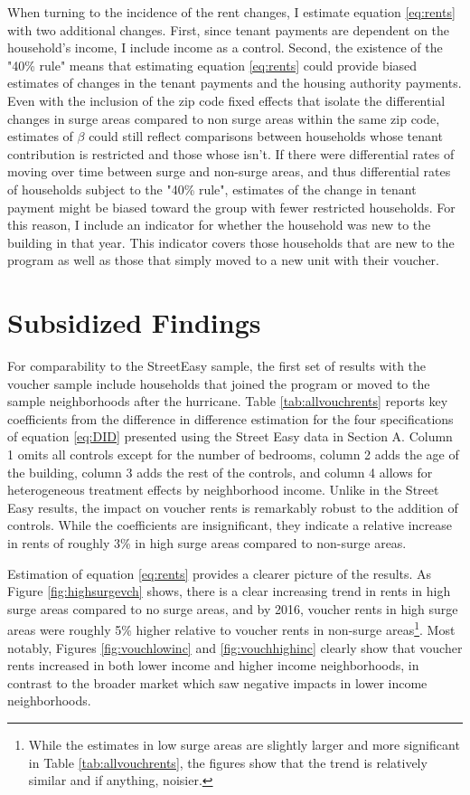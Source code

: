 \documentclass[12pt]{article}
\begin{document}
{{{{{When turning to the incidence of the rent changes, I estimate equation \ref{eq:rents} with two additional changes.  First, since tenant payments are dependent on the household's income, I include income as a control.  Second, the existence of the "40\% rule" means that estimating equation \ref{eq:rents} could provide biased estimates of changes in the tenant payments and the housing authority payments.  Even with the inclusion of the zip code fixed effects that isolate the differential changes in surge areas compared to non surge areas within the same zip code, estimates of $\beta$ could still reflect comparisons between households whose tenant contribution is restricted and those whose isn't.  If there were differential rates of moving over time between surge and non-surge areas, and thus differential rates of households subject to the "40\% rule", estimates of the change in tenant payment might be biased toward the group with fewer restricted households.  For this reason, I include an indicator for whether the household was new to the building in that year.  This indicator covers those households that are new to the program as well as those that simply moved to a new unit with their voucher.


\section{Subsidized Findings}

For comparability to the StreetEasy sample, the first set of results with the voucher sample include households that joined the program or moved to the sample neighborhoods after the hurricane. Table \ref{tab:allvouchrents} reports key coefficients from the difference in difference estimation for the four specifications of equation \ref{eq:DID} presented using the Street Easy data in Section A.  Column 1 omits all controls except for the number of bedrooms, column 2 adds the age of the building, column 3 adds the rest of the controls, and column 4 allows for heterogeneous treatment effects by neighborhood income.  Unlike in the Street Easy results, the impact on voucher rents is remarkably robust to the addition of controls.  While the coefficients are insignificant, they indicate a relative increase in rents of roughly 3\% in high surge areas compared to non-surge areas.  

Estimation of equation \ref{eq:rents} provides a clearer picture of the results. As Figure \ref{fig:highsurgevch} shows, there is a clear increasing trend in rents in high surge areas compared to no surge areas, and by 2016, voucher rents in high surge areas were roughly 5\% higher relative to voucher rents in non-surge areas\footnote{While the estimates in low surge areas are slightly larger and more significant in Table \ref{tab:allvouchrents}, the figures show that the trend is relatively similar and if anything, noisier.}. Most notably, Figures \ref{fig:vouchlowinc} and \ref{fig:vouchhighinc} clearly show that voucher rents increased in both lower income and higher income neighborhoods, in contrast to the broader market which saw negative impacts in lower income neighborhoods.

}}}}}
\end{document}
